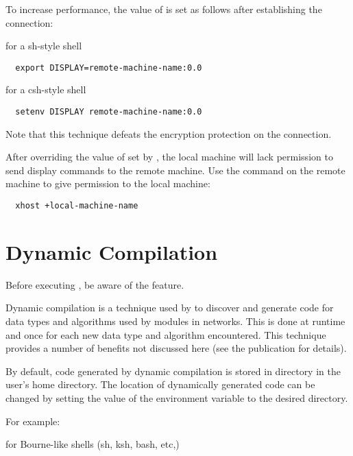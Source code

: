 To increase performance, the value of  is set as
follows after establishing the  connection:

for a sh-style shell

\begin{verbatim}
  export DISPLAY=remote-machine-name:0.0
\end{verbatim}
  
for a csh-style shell

\begin{verbatim}
  setenv DISPLAY remote-machine-name:0.0
\end{verbatim}

Note that this technique defeats the encryption protection on the
connection.

After overriding the value of  set by ,
the local machine will lack permission to send display commands to the
remote machine.  Use the  command on the remote machine
to give permission to the local machine:

\begin{verbatim}
  xhost +local-machine-name
\end{verbatim}
  

\section{Dynamic Compilation}
\label{sec:dyncomp}

Before executing \sr{},  be aware of the
 feature.

Dynamic compilation is a technique used by \sr{} to discover and
generate code for data types and algorithms used by modules in
networks.  This is done at runtime and once for each new
data type and algorithm encountered.  This technique provides a number
of benefits not discussed here (see the publication 
for details).

By default, code generated by dynamic compilation is stored in
directory  in the user's home directory.
The location of dynamically generated code can be changed by setting
the value of the environment variable
 to the desired directory.

For example:

for Bourne-like shells (sh, ksh, bash, etc,)

